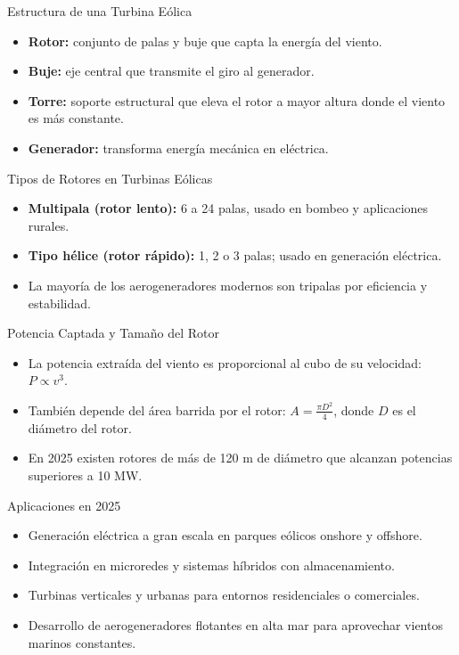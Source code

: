 \documentclass[main.tex]{subfiles}
\begin{document}
\begin{frame}{Estructura de una Turbina Eólica}
  \begin{itemize}
    \item \textbf{Rotor:} conjunto de palas y buje que capta la energía del viento.
    \item \textbf{Buje:} eje central que transmite el giro al generador.
    \item \textbf{Torre:} soporte estructural que eleva el rotor a mayor altura donde el viento es más constante.
    \item \textbf{Generador:} transforma energía mecánica en eléctrica.
  \end{itemize}
\end{frame}

\begin{frame}{Tipos de Rotores en Turbinas Eólicas}
  \begin{itemize}
    \item \textbf{Multipala (rotor lento):} 6 a 24 palas, usado en bombeo y aplicaciones rurales.
    \item \textbf{Tipo hélice (rotor rápido):} 1, 2 o 3 palas; usado en generación eléctrica.
    \item La mayoría de los aerogeneradores modernos son tripalas por eficiencia y estabilidad.
  \end{itemize}
\end{frame}


\begin{frame}{Potencia Captada y Tamaño del Rotor}
  \begin{itemize}
    \item La potencia extraída del viento es proporcional al cubo de su velocidad: \( P \propto v^3 \).
    \item También depende del área barrida por el rotor: \( A = \frac{\pi D^2}{4} \), donde \( D \) es el diámetro del rotor.
    \item En 2025 existen rotores de más de 120 m de diámetro que alcanzan potencias superiores a 10 MW.
  \end{itemize}
\end{frame}



\begin{frame}{Aplicaciones en 2025}
  \begin{itemize}
    \item Generación eléctrica a gran escala en parques eólicos onshore y offshore.
    \item Integración en microredes y sistemas híbridos con almacenamiento.
    \item Turbinas verticales y urbanas para entornos residenciales o comerciales.
    \item Desarrollo de aerogeneradores flotantes en alta mar para aprovechar vientos marinos constantes.
  \end{itemize}
\end{frame}
\end{document}

